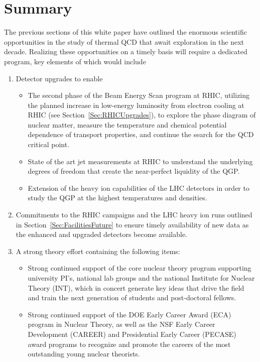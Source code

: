 \section{Summary}
\label{Sec:Summary}
The previous sections of this white paper have outlined the enormous scientific opportunities in the study of thermal QCD that await exploration in the next decade. Realizing these opportunities on a timely basis will require a dedicated program, key elements of which would include

\begin{enumerate}

\item Detector upgrades to enable 
\begin{itemize}
   \item The second phase of the Beam Energy Scan program at RHIC, utilizing the planned increase in low-energy luminosity from electron cooling at RHIC (see Section~\ref{Sec:RHICUpgrades}),
    to explore the phase diagram of nuclear matter,
    measure the temperature and chemical potential dependence of transport properties,
     and continue the search for the QCD critical point. 
   \item State of the art jet measurements at RHIC to understand the underlying degrees of freedom that create the near-perfect liquidity of the QGP.
   \item Extension of the heavy ion capabilities of the LHC detectors in order to study the QGP at the highest temperatures and densities. 
\end{itemize}

\item Commitments to the RHIC campaigns and the LHC heavy ion runs outlined in Section~\ref{Sec:FacilitiesFuture} to ensure timely availability of new data as the enhanced and upgraded detectors become available. 

\item A strong theory effort containing the following items:


\begin{itemize}
\item Strong continued support of the core nuclear theory program supporting university PI's, national lab groups and the national Institute for Nuclear Theory (INT), which in concert generate key ideas that drive the field and train the next generation of students and post-doctoral fellows.

\item Strong continued support of the DOE Early Career Award (ECA) program in Nuclear Theory, as well as the NSF Early Career Development (CAREER) and Presidential Early Career (PECASE) award programs to recognize and promote the careers of the most outstanding young nuclear theorists. 


\end{itemize}
\end{enumerate}
